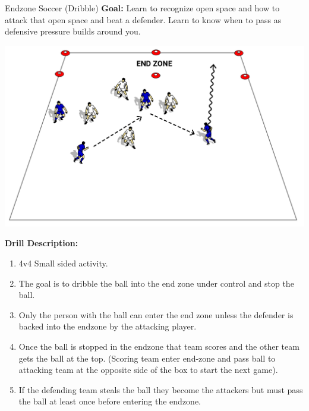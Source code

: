 \begin{evenBlock}{Endzone Soccer (Dribble)}
\textbf{Goal:} Learn to recognize open space and how to attack that open space and beat a defender.  Learn to know when to pass as defensive pressure builds around you.
\begin{minipage}[t]{\linewidth}
    \begin{minipage}{.3\linewidth} %
        \centering
        \includegraphics[width=\textwidth]{../img/Trimmed/EndZoneSoccer_DribbleScore}
    \end{minipage}
    \hspace{0.05\linewidth}
    \begin{minipage}{.6\linewidth} %
        \textbf{Drill Description:}
        \begin{enumerate}
            \setlength{\itemsep}{0pt}
            \setlength{\parskip}{0pt}
            \setlength{\parsep}{0pt}
            \item 4v4 Small sided activity.
            \item The goal is to dribble the ball into the end zone under control and stop the ball.
            \item Only the person with the ball can enter the end zone unless the defender is backed into the endzone by the attacking player.
            \item Once the ball is stopped in the endzone that team scores and the other team gets the ball at the top.  (Scoring team enter end-zone and pass ball to attacking team at the opposite side of the box to start the next game).
            \item If the defending team steals the ball they become the attackers but must pass the ball at least once before entering the endzone.

\end{enumerate}
\end{minipage}
\end{minipage}
\end{evenBlock}
